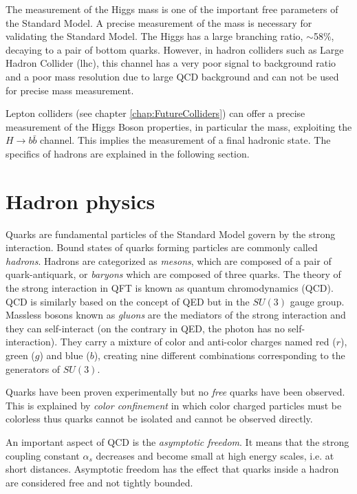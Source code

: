 The measurement of the Higgs mass is one of the important free parameters of the Standard Model. A precise measurement of the mass is necessary for validating the Standard Model. The Higgs has a large branching ratio, $\sim$58\%, decaying to a pair of bottom quarks. However, in hadron colliders such as Large Hadron Collider (\acrshort{lhc}), this channel has a very poor signal to background ratio and a poor mass resolution due to large QCD background and can not be used for precise mass measurement.

Lepton colliders (see chapter \ref{chap:FutureColliders}) can offer a precise measurement of the Higgs Boson properties, in particular the mass, exploiting the $H \rightarrow b\bar{b}$ channel. This implies the measurement of a final hadronic state. The specifics of hadrons are explained in the following section.

\section{Hadron physics}
\label{sec:Hadrons}

Quarks are fundamental particles of the Standard Model govern by the strong interaction. Bound states of quarks forming particles are commonly called \textit{hadrons}. Hadrons are categorized as \textit{mesons}, which are composed of a pair of quark-antiquark, or \textit{baryons} which are composed of three quarks. The theory of the strong interaction in QFT is known as quantum chromodynamics (QCD). QCD is similarly based on the concept of QED but in the $SU(3)$ gauge group. Massless bosons known as \textit{gluons} are the mediators of the strong interaction and they can self-interact (on the contrary in QED, the photon has no self-interaction). They carry a mixture of color and anti-color charges named red ($r$), green ($g$) and blue ($b$), creating nine different combinations corresponding to the generators of $SU(3)$.

Quarks have been proven experimentally but no \textit{free} quarks have been observed. This is explained by \textit{color confinement} in which color charged particles must be colorless thus quarks cannot be isolated and cannot be observed directly.

An important aspect of QCD is the \textit{asymptotic freedom}. It means that the strong coupling constant $\alpha_s$ decreases and become small at high energy scales, i.e. at short distances. Asymptotic freedom has the effect that quarks inside a hadron are considered free and not tightly bounded.


